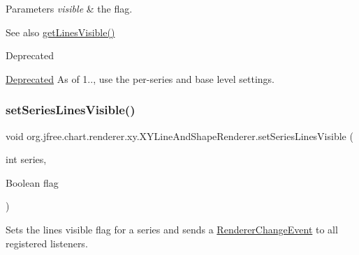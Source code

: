 \begin{DoxyParams}{Parameters}
{\em visible} & the flag.\\
\hline
\end{DoxyParams}
\begin{DoxySeeAlso}{See also}
\mbox{\hyperlink{classorg_1_1jfree_1_1chart_1_1renderer_1_1xy_1_1_x_y_line_and_shape_renderer_af0fece769cf57e414721478f2b43411c}{get\+Lines\+Visible()}}
\end{DoxySeeAlso}
\begin{DoxyRefDesc}{Deprecated}
\item[\mbox{\hyperlink{deprecated__deprecated000244}{Deprecated}}]As of 1.., use the per-\/series and base level settings. \end{DoxyRefDesc}
\mbox{\label{classorg_1_1jfree_1_1chart_1_1renderer_1_1xy_1_1_x_y_line_and_shape_renderer_a3e09e10111a246bb357322764827c6bb}} 
\subsubsection{\texorpdfstring{set\+Series\+Lines\+Visible()}{setSeriesLinesVisible()}\hspace{0.1cm}{\footnotesize\ttfamily [1/2]}}
{\footnotesize\ttfamily void org.\+jfree.\+chart.\+renderer.\+xy.\+X\+Y\+Line\+And\+Shape\+Renderer.\+set\+Series\+Lines\+Visible (\begin{DoxyParamCaption}\item[{int}]{series,  }\item[{Boolean}]{flag }\end{DoxyParamCaption})}

Sets the \textquotesingle{}lines visible\textquotesingle{} flag for a series and sends a \mbox{\hyperlink{}{Renderer\+Change\+Event}} to all registered listeners.


